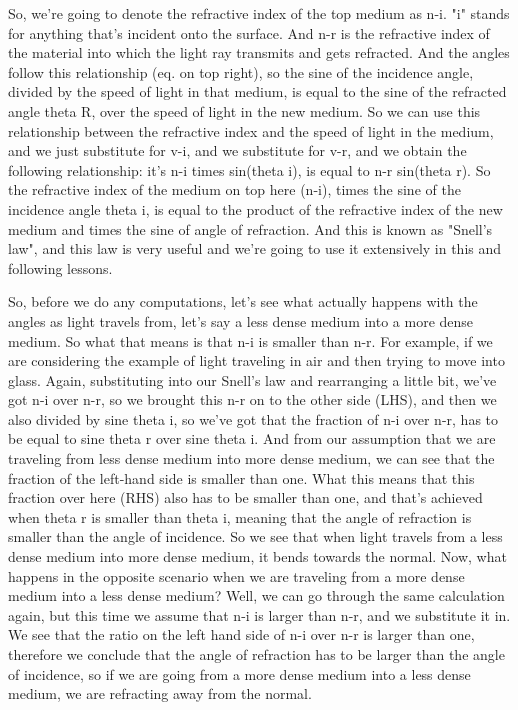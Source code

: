 So, we're going to denote the refractive index of the top medium as n-i. "i" stands for anything that's incident onto the surface. And n-r is the refractive index of the material into which the light ray transmits and gets refracted. And the angles follow this relationship (eq. on top right), so the sine of the incidence angle, divided by the speed of light in that medium, is equal to the sine of the refracted angle theta R, over the speed of light in the new medium. So we can use this relationship between the refractive index and the speed of light in the medium, and we just substitute for v-i, and we substitute for v-r, and we obtain the following relationship: it's n-i times sin(theta i), is equal to n-r sin(theta r). So the refractive index of the medium on top here (n-i), times the sine of the incidence angle theta i, is equal to the product of the refractive index of the new medium and times the sine of angle of refraction. And this is known as "Snell's law", and this law is very useful and we're going to use it extensively in this and following lessons.

So, before we do any computations, let's see what actually happens with the angles as light travels from, let's say a less dense medium into a more dense medium. So what that means is that n-i is smaller than n-r. For example, if we are considering the example of light traveling in air and then trying to move into glass. Again, substituting into our Snell's law and rearranging a little bit, we've got n-i over n-r, so we brought this n-r on to the other side (LHS), and then we also divided by sine theta i, so we've got that the fraction of n-i over n-r, has to be equal to sine theta r over sine theta i. And from our assumption that we are traveling from less dense medium into more dense medium, we can see that the fraction of the left-hand side is smaller than one. What this means that this fraction over here (RHS) also has to be smaller than one, and that's achieved when theta r is smaller than theta i, meaning that the angle of refraction is smaller than the angle of incidence. So we see that when light travels from a less dense medium into more dense medium, it bends towards the normal. Now, what happens in the opposite scenario when we are traveling from a more dense medium into a less dense medium? Well, we can go through the same calculation again, but this time we assume that n-i is larger than n-r, and we substitute it in. We see that the ratio on the left hand side of n-i over n-r is larger than one, therefore we conclude that the angle of refraction has to be larger than the angle of incidence, so if we are going from a more dense medium into a less dense medium, we are refracting away from the normal.




